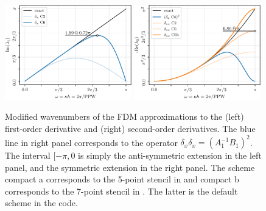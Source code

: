 \begin{figure}
  \includegraphics[clip,width=0.49\textwidth]{figs/fdm1}\hfill
  \includegraphics[clip,width=0.49\textwidth]{figs/fdm2}
  \caption{Modified wavenumbers of the FDM approximations to the (left) first-order derivative and (right) second-order derivatives. The blue line in right panel corresponds to the operator $\delta_{x}\delta_{x} =(A_1^{-1}B_1)^2$. The interval $[-\pi,0$ is simply the anti-symmetric extension in the left panel, and the symmetric extension in the right panel. The scheme compact a corresponds to the 5-point stencil in \cite{Lele:1992} and compact b corresponds to the 7-point stencil in \cite{Lamballais:2011}. The latter is the default scheme in the code.}
  \label{fig:fdm}
\end{figure}

